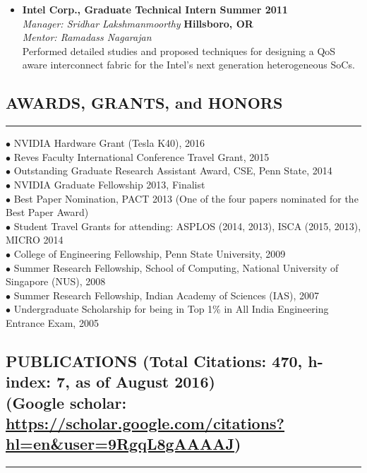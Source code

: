 \documentclass[10pt,a4]{article}
\begin{document}
\begin{itemize}
\item{\bf Intel Corp., Graduate Technical Intern \hfill {\bf Summer 2011}} \\
{\it Manager: Sridhar Lakshmanmoorthy}  \hfill {\bf Hillsboro, OR} \\ 
{\it Mentor: Ramadass Nagarajan}   \\
Performed detailed studies and proposed techniques for designing a QoS aware 
interconnect fabric for the Intel's next generation heterogeneous SoCs. 

\end{itemize}

\subsection*{AWARDS, GRANTS, and HONORS}
\hrule
\vspace{0.2cm}
$\bullet$  NVIDIA Hardware Grant (Tesla K40), 2016 \\
$\bullet$  Reves Faculty International Conference Travel Grant, 2015 \\
$\bullet$  Outstanding Graduate Research Assistant Award, CSE, Penn State, 2014 \\
$\bullet$  NVIDIA Graduate Fellowship 2013, Finalist \\
$\bullet$  Best Paper Nomination, PACT 2013 (One of the four papers nominated for the Best Paper Award) \\
$\bullet$  Student Travel Grants for attending: ASPLOS (2014, 2013), ISCA (2015, 2013), MICRO 2014 \\
$\bullet$  College of Engineering Fellowship, Penn State University, 2009 \\
$\bullet$  Summer Research Fellowship, School of Computing, National University of Singapore (NUS), 2008 \\
$\bullet$  Summer Research Fellowship, Indian Academy of Sciences (IAS), 2007 \\
$\bullet$  Undergraduate Scholarship for being in Top 1\% in All India Engineering Entrance Exam, 2005

\subsection*{PUBLICATIONS (Total Citations: 470, h-index: 7, as of August 2016) \\ (Google scholar: \url{https://scholar.google.com/citations?hl=en&user=9RgqL8gAAAAJ}) }
\hrule
\vspace{0.2cm}
\end{document}
